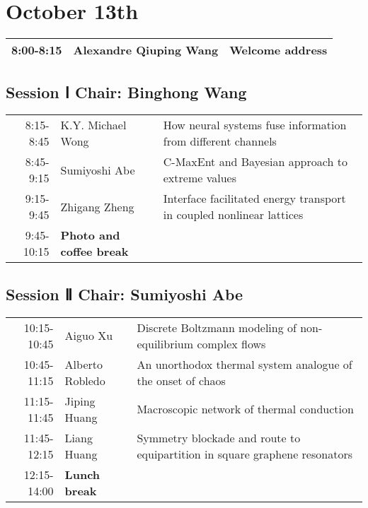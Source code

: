 \documentclass[11pt]{article}
\date{}
\title{}
\begin{document}
\section*{October 13th}
\label{sec:orgd7ade9a}

\begin{center}
\begin{tabular}{lll}
\hline
  8:00-8:15 &   Alexandre Qiuping Wang &  Welcome address\\
\hline
\end{tabular}
\end{center}



\subsection*{Session Ⅰ Chair: Binghong Wang}
\label{sec:org5796bf6}
\begin{center}
\begin{tabular}{rll}
\hline
8:15-8:45 & K.Y. Michael Wong & How neural systems fuse information from different channels\\
8:45-9:15 & Sumiyoshi Abe & C-MaxEnt and Bayesian approach to extreme values\\
9:15-9:45 & Zhigang Zheng & Interface facilitated energy transport in coupled nonlinear lattices\\
 9:45-10:15 &  \textbf{Photo and coffee break} & \\
\hline
\end{tabular}
\end{center}



\subsection*{Session Ⅱ Chair: Sumiyoshi Abe}
\label{sec:org93872d5}


\begin{center}
\begin{tabular}{rll}
\hline
10:15-10:45 & Aiguo Xu & Discrete Boltzmann modeling of non-equilibrium complex flows\\
10:45-11:15 & Alberto Robledo & An unorthodox thermal system analogue of the onset of chaos\\
11:15-11:45 & Jiping Huang & Macroscopic network of thermal conduction\\
11:45-12:15 & Liang Huang & Symmetry blockade and route to equipartition in square graphene resonators\\
 12:15-14:00 &  \textbf{Lunch break} & \\
\hline
\end{tabular}
\end{center}
\end{document}

